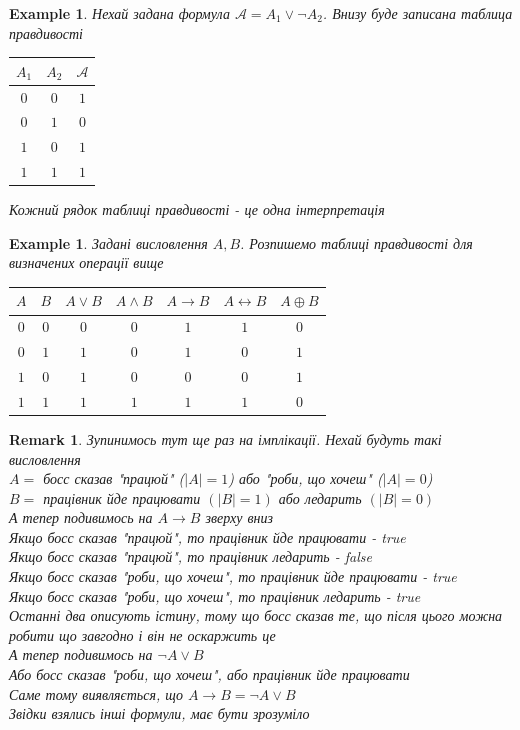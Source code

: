 \documentclass[a4paper, 14pt]{extarticle}
\theoremstyle{theoremdd}
\theoremstyle{theoremdd}
\theoremstyle{theoremdd}
\theoremstyle{theoremdd}
\newtheorem{example}[theorem]{Example}
\theoremstyle{theoremdd}
\theoremstyle{theoremdd}
\newtheorem{remark}[theorem]{Remark}
\theoremstyle{theoremdd}
\theoremstyle{theoremdd}
\begin{document}
\begin{example}
Нехай задана формула $\mathcal{A} = A_1 \vee \neg A_2$. Внизу буде записана таблица правдивості
\begin{center}
\begin{tabular}{ |c|c|c| } 
 \hline
 $A_1$ & $A_2$ & $\mathcal{A}$ \\
 \hline
 $0$ & $0$ & $1$ \\ 
 $0$ & $1$ & $0$ \\ 
 $1$ & $0$ & $1$ \\
 $1$ & $1$ & $1$ \\ 
 \hline
\end{tabular}
\end{center}
Кожний рядок таблиці правдивості - це одна інтерпретація
\end{example}

\begin{example}
Задані висловлення $A,B$. Розпишемо таблиці правдивості для визначених операції вище
\begin{center}
\begin{tabular}{ |c|c|c|c|c|c|c| } 
 \hline
 $A$ & $B$ & $A \vee B$ & $A \wedge B$ & $A \rightarrow B$ & $A \leftrightarrow B$ & $A \oplus B$ \\
 \hline
 $0$ & $0$ & $0$ & $0$ & $1$ & $1$ & $0$ \\ 
 $0$ & $1$ & $1$ & $0$ & $1$ & $0$ & $1$ \\ 
 $1$ & $0$ & $1$ & $0$ & $0$ & $0$ & $1$ \\
 $1$ & $1$ & $1$ & $1$ & $1$ & $1$ & $0$ \\ 
 \hline
\end{tabular}
\end{center}
\end{example}

\begin{remark}
Зупинимось тут ще раз на імплікації. Нехай будуть такі висловлення\\
$A =$ босс сказав "працюй" ($|A| = 1$) або "роби, що хочеш" ($|A| = 0$)\\
$B = $ працівник йде працювати $(|B| = 1)$ або ледарить $(|B| = 0)$\\
А тепер подивимось на $A \rightarrow B$ зверху вниз\\
Якщо босс сказав "працюй", то працівник йде працювати - true\\
Якщо босс сказав "працюй", то працівник ледарить - false\\
Якщо босс сказав "роби, що хочеш", то працівник йде працювати - true\\
Якщо босс сказав "роби, що хочеш", то працівник ледарить - true\\
Останні два описують істину, тому що босс сказав те, що після цього можна робити що завгодно і він не оскаржить це \\
А тепер подивимось на $\neg A \vee B$\\
Або босс сказав "роби, що хочеш", або працівник йде працювати\\
Саме тому виявляється, що $A \rightarrow B = \neg A \vee B$
\bigskip \\
Звідки взялись інші формули, має бути зрозуміло
\end{remark}
\end{document}

